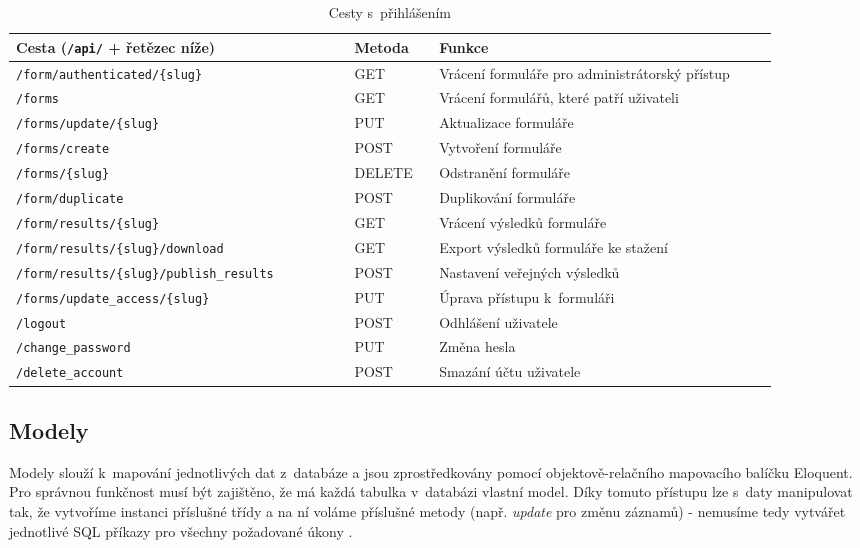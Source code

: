 	\begin{table}[H]
		\centering
		\begin{tabular}{ | p{0.4\linewidth} | p{0.1\linewidth} | p{0.4\linewidth} | } 
			\hline
			\textbf{Cesta (\texttt{/api/} + řetězec níže)} & \textbf{Metoda} & \textbf{Funkce} \\ 
			\hline
			\texttt{/form/authenticated/\{slug\}} & GET & Vrácení formuláře pro administrátorský přístup \\
			\hline
			\texttt{/forms} & GET & Vrácení formulářů, které patří uživateli \\
			\hline
			\texttt{/forms/update/\{slug\}} & PUT & Aktualizace formuláře \\
			\hline
			\texttt{/forms/create} & POST & Vytvoření formuláře \\
			\hline
			\texttt{/forms/\{slug\}} & DELETE & Odstranění formuláře \\
			\hline
			\texttt{/form/duplicate} & POST & Duplikování formuláře \\
			\hline
			\texttt{/form/results/\{slug\}} & GET & Vrácení výsledků formuláře \\
			\hline
			\texttt{/form/results/\{slug\}/download} & GET & Export výsledků formuláře ke stažení \\
			\hline
			\texttt{/form/results/\{slug\}/\newline publish\_results} & POST & Nastavení veřejných výsledků \\
			\hline
			\texttt{/forms/update\_access/\{slug\}} & PUT & Úprava přístupu k~formuláři \\
			\hline
			\texttt{/logout} & POST & Odhlášení uživatele \\
			\hline
			\texttt{/change\_password} & PUT & Změna hesla \\
			\hline
			\texttt{/delete\_account} & POST & Smazání účtu uživatele \\
			\hline
		\end{tabular}
		\caption{Cesty s~přihlášením}
		\label{tab:cesty_s_prihlasenim}
	\end{table}
	\newpage
	
	\subsection{Modely}
	Modely slouží k~mapování jednotlivých dat z~databáze a jsou zprostředkovány pomocí objektově-relačního mapovacího balíčku Eloquent. Pro správnou funkčnost musí být zajištěno, že má každá tabulka v~databázi vlastní model. Díky tomuto přístupu lze s~daty manipulovat tak, že vytvoříme instanci příslušné třídy a na ní voláme příslušné metody (např. \textit{update} pro změnu záznamů) - nemusíme tedy vytvářet jednotlivé SQL příkazy pro všechny požadované úkony \cite{LaravelORM}.
	
